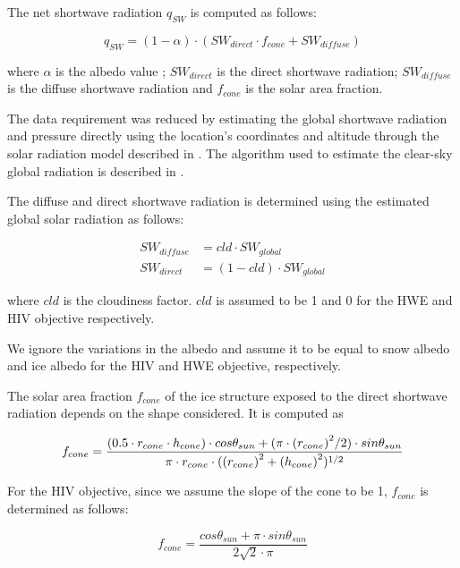 \documentclass[tc, manuscript]{copernicus}
\begin{document}
The net shortwave radiation $q_{SW}$ is computed as follows:

\begin{equation} 
q_{SW} = (1- \alpha) \cdot ( SW_{direct} \cdot f_{cone} + SW_{diffuse})
\label{eqn:SW} 
\end{equation}

where $\alpha$ is the albedo value ; $SW_{direct}$ is the direct shortwave radiation; $SW_{diffuse}$ is the
diffuse shortwave radiation and $f_{cone}$ is the solar area fraction.

The data requirement was reduced by estimating the global shortwave radiation and pressure directly using the
location's coordinates and altitude through the solar radiation model described in
\citet{holmgrenPvlibPythonPython2018}. The algorithm used to estimate the clear-sky global radiation is
described in \citet{ineichenBroadbandSimplifiedVersion2008}.  

The diffuse and direct shortwave radiation is determined using the estimated global solar radiation as follows:

\begin{equation}
\begin{split}
  SW_{diffuse} &= cld \cdot SW_{global}\\
  SW_{direct} &= (1-cld) \cdot SW_{global}
\end{split}
\end{equation}

where $cld$ is the cloudiness factor. $cld$ is assumed to be 1 and 0 for the HWE and HIV objective
respectively.

We ignore the variations in the albedo and assume it to be equal to snow albedo and ice albedo for the HIV and
HWE objective, respectively.

The solar area fraction $f_{cone}$ of the ice structure exposed to the direct shortwave radiation depends on the
shape considered. It is computed as

\begin{equation}
		f_{cone} =\frac{(0.5 \cdot r_{cone} \cdot h_{cone}) \cdot cos \theta_{sun} +(\pi \cdot
			{(r_{cone})}^2/2) \cdot sin \theta_{sun} }{\pi \cdot r_{cone} \cdot ({(r_{cone})}^2+{(h_{cone})}^2)^{1/2}}\\
\end{equation}

For the HIV objective, since we assume the slope of the cone to be 1, $f_{cone}$ is determined as follows:

\begin{equation}
		f_{cone} =\frac{ cos \theta_{sun} + \pi \cdot sin \theta_{sun} }{2\sqrt{2} \cdot \pi }
\end{equation}
\end{document}
